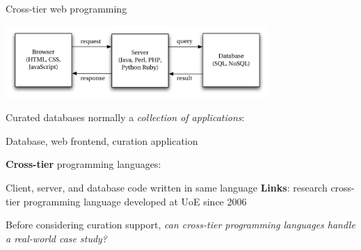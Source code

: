 \documentclass[11.5pt, aspectratio=169]{beamer}
\begin{document}
\begin{frame}{Cross-tier web programming}

  \begin{center}
    \includegraphics[width=0.75\textwidth]{images/3tier.pdf}
  \end{center}

  \begin{fullpageitemize}
  \item Curated databases normally a
    \emph{collection of applications}:
    \begin{itemize}
      \itemR Database, web frontend, curation application
    \end{itemize}
    \vspace{1em}
  \item \textbf{Cross-tier} programming languages:
    \begin{itemize}
      \itemR Client, server, and database code written in same language
      \itemR \textbf{Links}: research cross-tier programming language developed
        at UoE since 2006
    \end{itemize}
    \vspace{1em}
  \item Before considering curation support, \emph{can cross-tier programming
    languages handle a real-world case study?}
  \end{fullpageitemize}
\end{frame}
\end{document}
